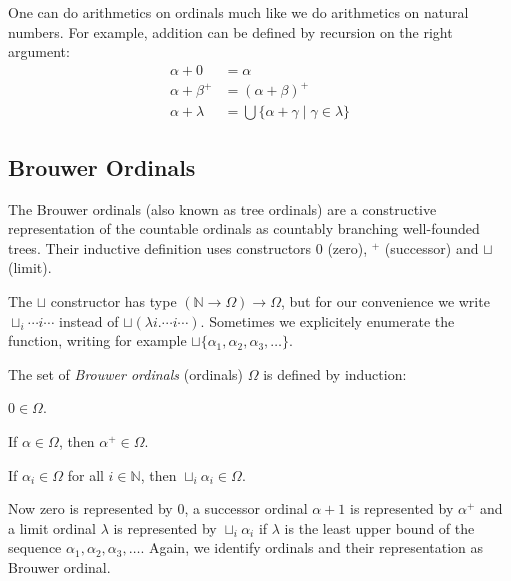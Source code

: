 
One can do arithmetics on ordinals much like we do arithmetics on natural
numbers. For example, addition can be defined by recursion on the right
argument:
\begin{align*}
  \alpha + 0       &= \alpha\\
  \alpha + \beta^+ &= (\alpha + \beta)^+\\
  \alpha + \lambda &= \bigcup \{ \alpha + \gamma \; | \; \gamma \in \lambda \}
\end{align*}


\subsection{Brouwer Ordinals}\label{sub:brouwer}

The Brouwer ordinals (also known as tree ordinals) are a constructive
representation of the countable ordinals as countably branching well-founded
trees. Their inductive definition uses constructors $0$ (zero), $^+$
(successor) and $\sqcup$ (limit).

The $\sqcup$ constructor has type $(\mathbb{N} \rightarrow \Omega) \rightarrow
\Omega$, but for our convenience we write $\sqcup_i \cdots i \cdots$ instead
of $\sqcup (\lambda i . \cdots i \cdots)$. Sometimes we explicitely enumerate
the function, writing for example $\sqcup \{ \alpha_1, \alpha_2, \alpha_3,
\ldots \}$.

\begin{definition}\label{def:ordinals}%
The set of \emph{Brouwer ordinals} (ordinals) $\Omega$ is defined by
induction:
\begin{compactenum}
  \item
    $0 \in \Omega$.
  \item
    If $\alpha \in \Omega$, then $\alpha^+ \in \Omega$.
  \item
    If $\alpha_i \in \Omega$ for all $i \in \mathbb{N}$, then $\sqcup_i
    \alpha_i \in \Omega$.
\end{compactenum}
\end{definition}

Now zero is represented by $0$, a successor ordinal $\alpha +1$ is represented
by $\alpha^+$ and a limit ordinal $\lambda$ is represented by $\sqcup_i
\alpha_i$ if $\lambda$ is the least upper bound of the sequence $\alpha_1,
\alpha_2, \alpha_3, \ldots$. %
Again, we identify ordinals and their representation as Brouwer ordinal.

